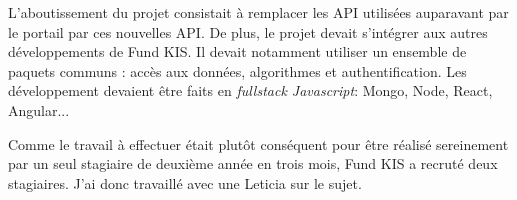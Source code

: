 \vspace{3mm}

L'aboutissement du projet consistait à remplacer les API utilisées auparavant par le portail par ces nouvelles API. De plus, le projet devait s'intégrer aux autres développements de Fund KIS. Il devait notamment utiliser un ensemble de paquets communs : accès aux données, algorithmes et authentification. Les développement devaient être faits en \textit{fullstack Javascript}: Mongo, Node, React, Angular...

Comme le travail à effectuer était plutôt conséquent pour être réalisé sereinement par un seul stagiaire de deuxième année en trois mois, Fund KIS a recruté deux stagiaires. J'ai donc travaillé avec une Leticia sur le sujet.
